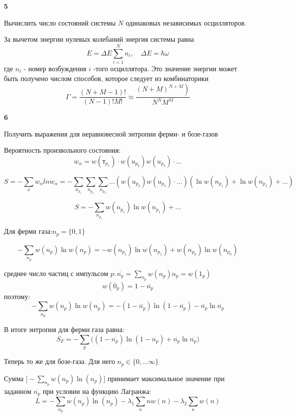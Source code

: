 \documentclass[a4paper,12pt]{article} %
\begin{document}
\begin{task}\textbf{5}

Вычислить число состояний системы $ N $ одинаковых независимых осцилляторов.


За вычетом энергии нулевых колебаний энергия системы равна
$$
E=\Delta E \sum_{i=1}^{N} n_{i}, \quad \Delta E=\hbar \omega
$$
где $n_{i}$ - номер возбуждения $i$ -того осциллятора. Это значение энергии может быть получено числом способов, которое следует из комбинаторики
$$
\Gamma=\frac{(N+M-1) !}{(N-1) ! M !} \approx \frac{\left.(N+M)^{N+M}\right)}{N^{N} M^{M}}
$$




\end{task}


\begin{task}\textbf{6}

Получить выражения для неравновесной энтропии ферми- и бозе-газов



Вероятность произвольного состояния:
$$
w_{\alpha}=w\left(т_{p_{1}}\right) \cdot w\left(u_{p_{2}}\right) w\left(u_{p_{3}}\right)\cdot ...
$$


$$
S=-\sum_{x} w_{\alpha} ln w_{\alpha}=-\sum_{n_{p_1}}\sum_{n_{p_2}}\sum_{n_{p_3}}\ldots 
(w\left(u_{p_{2}}\right) w\left(u_{p_{3}}\right)\cdot ...)
(\ln w(n_{p_1})+\ln w(n_{p_2})+... )
$$

\[ S=-\sum_{n_{p_1}}
w(n_{p_1}) \ln w(n_{p_1}) +\ldots \]



Для ферми газа:$ n_p=\{ 0, 1\} $

\[ -\sum_{n_p}w(n_{p}) \ln w(n_{p})=
-w(n_{p_1}) \ln w(n_{p_1})+
w(n_{p_0}) \ln w(n_{p_0})    \]


среднее число частиц с импульсом $ p: \overline{n_p}=\sum_{n_p}w(n_p) n_p =w (1_p)$
%
\[ w(0_p)=1-\overline{n_p} \]
%
поэтому:
\[ -\sum_{n_p}w(n_p)\ln w(n_p) = -(1-\overline{n_p})\ln (1-\overline{n_p}) - \overline{n_p} \ln \overline{n_p}\]


В итоге энтропия для ферми газа равна:
\[ S_F=-\sum_{p}\Big(
(1-\overline{n_p}) \ln (1-\overline{n_p})+\overline{n_p} \ln \overline{n_p}\Big) \]



Теперь то же для бозе-газа. Для него $ n_p\in \{0, ... \infty\} $


Сумма $ \Big[-\sum_{n_p} w(n_p) \ln (n_p)\Big]$ принимает максимальное значение при заданном $ \overline{n_p}$ при условии на функцию Лагранжа:
\[ L= -\sum_{n_p} w(n_p) \ln (n_p) -\lambda_1 \sum_n n w(n) - \lambda_2 \sum_n w(n)\]


\end{task}
\end{document}
